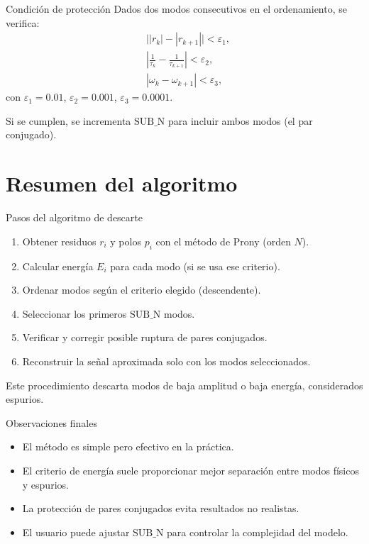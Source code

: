 \documentclass{beamer}
\begin{document}
\begin{frame}{Condición de protección}
Dados dos modos consecutivos en el ordenamiento, se verifica:
\[
\begin{aligned}
&\bigl||r_k|-|r_{k+1}|\bigr| < \varepsilon_1,\\
&\left|\frac{1}{\tau_k}-\frac{1}{\tau_{k+1}}\right| < \varepsilon_2,\\
&|\omega_k-\omega_{k+1}| < \varepsilon_3,
\end{aligned}
\]
con \(\varepsilon_1=0.01\), \(\varepsilon_2=0.001\), \(\varepsilon_3=0.0001\).
\vspace{0.3cm}

Si se cumplen, se incrementa \(\text{SUB\_N}\) para incluir ambos modos (el par conjugado).
\end{frame}

\section{Resumen del algoritmo}

\begin{frame}{Pasos del algoritmo de descarte}
\begin{enumerate}
  \item Obtener residuos \(r_i\) y polos \(p_i\) con el método de Prony (orden \(N\)).
  \item Calcular energía \(E_i\) para cada modo (si se usa ese criterio).
  \item Ordenar modos según el criterio elegido (descendente).
  \item Seleccionar los primeros \(\text{SUB\_N}\) modos.
  \item Verificar y corregir posible ruptura de pares conjugados.
  \item Reconstruir la señal aproximada solo con los modos seleccionados.
\end{enumerate}
Este procedimiento descarta modos de baja amplitud o baja energía, considerados espurios.
\end{frame}

\begin{frame}{Observaciones finales}
\begin{itemize}
  \item El método es simple pero efectivo en la práctica.
  \item El criterio de energía suele proporcionar mejor separación entre modos físicos y espurios.
  \item La protección de pares conjugados evita resultados no realistas.
  \item El usuario puede ajustar \(\text{SUB\_N}\) para controlar la complejidad del modelo.
\end{itemize}
\end{frame}



\ThankYouFrame
\end{document}
